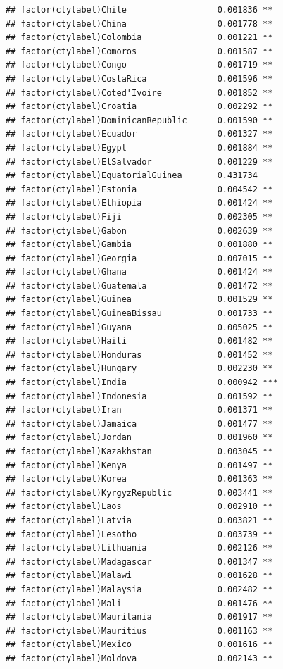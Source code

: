 \documentclass[12pt]{article}\usepackage[]{graphicx}\usepackage[]{color}
\makeatletter
\newenvironment{kframe}{%
 \def\at@end@of@kframe{}%
 \ifinner\ifhmode%
  \def\at@end@of@kframe{\end{minipage}}%
  \begin{minipage}{\columnwidth}%
 \fi\fi%
 \def\FrameCommand##1{\hskip\@totalleftmargin \hskip-\fboxsep
 \colorbox{shadecolor}{##1}\hskip-\fboxsep
     \hskip-\linewidth \hskip-\@totalleftmargin \hskip\columnwidth}%
 \MakeFramed {\advance\hsize-\width
   \@totalleftmargin\z@ \linewidth\hsize
   \@setminipage}}%
 {\par\unskip\endMakeFramed%
 \at@end@of@kframe}
\newenvironment{knitrout}{}{} %
\makeatother
\begin{document}
\begin{knitrout}
\begin{kframe}
\begin{verbatim}
## factor(ctylabel)Chile                  0.001836 ** 
## factor(ctylabel)China                  0.001778 ** 
## factor(ctylabel)Colombia               0.001221 ** 
## factor(ctylabel)Comoros                0.001587 ** 
## factor(ctylabel)Congo                  0.001719 ** 
## factor(ctylabel)CostaRica              0.001596 ** 
## factor(ctylabel)Coted'Ivoire           0.001852 ** 
## factor(ctylabel)Croatia                0.002292 ** 
## factor(ctylabel)DominicanRepublic      0.001590 ** 
## factor(ctylabel)Ecuador                0.001327 ** 
## factor(ctylabel)Egypt                  0.001884 ** 
## factor(ctylabel)ElSalvador             0.001229 ** 
## factor(ctylabel)EquatorialGuinea       0.431734    
## factor(ctylabel)Estonia                0.004542 ** 
## factor(ctylabel)Ethiopia               0.001424 ** 
## factor(ctylabel)Fiji                   0.002305 ** 
## factor(ctylabel)Gabon                  0.002639 ** 
## factor(ctylabel)Gambia                 0.001880 ** 
## factor(ctylabel)Georgia                0.007015 ** 
## factor(ctylabel)Ghana                  0.001424 ** 
## factor(ctylabel)Guatemala              0.001472 ** 
## factor(ctylabel)Guinea                 0.001529 ** 
## factor(ctylabel)GuineaBissau           0.001733 ** 
## factor(ctylabel)Guyana                 0.005025 ** 
## factor(ctylabel)Haiti                  0.001482 ** 
## factor(ctylabel)Honduras               0.001452 ** 
## factor(ctylabel)Hungary                0.002230 ** 
## factor(ctylabel)India                  0.000942 ***
## factor(ctylabel)Indonesia              0.001592 ** 
## factor(ctylabel)Iran                   0.001371 ** 
## factor(ctylabel)Jamaica                0.001477 ** 
## factor(ctylabel)Jordan                 0.001960 ** 
## factor(ctylabel)Kazakhstan             0.003045 ** 
## factor(ctylabel)Kenya                  0.001497 ** 
## factor(ctylabel)Korea                  0.001363 ** 
## factor(ctylabel)KyrgyzRepublic         0.003441 ** 
## factor(ctylabel)Laos                   0.002910 ** 
## factor(ctylabel)Latvia                 0.003821 ** 
## factor(ctylabel)Lesotho                0.003739 ** 
## factor(ctylabel)Lithuania              0.002126 ** 
## factor(ctylabel)Madagascar             0.001347 ** 
## factor(ctylabel)Malawi                 0.001628 ** 
## factor(ctylabel)Malaysia               0.002482 ** 
## factor(ctylabel)Mali                   0.001476 ** 
## factor(ctylabel)Mauritania             0.001917 ** 
## factor(ctylabel)Mauritius              0.001163 ** 
## factor(ctylabel)Mexico                 0.001616 ** 
## factor(ctylabel)Moldova                0.002143 ** 

\end{verbatim}
\end{kframe}
\end{knitrout}
\end{document}

